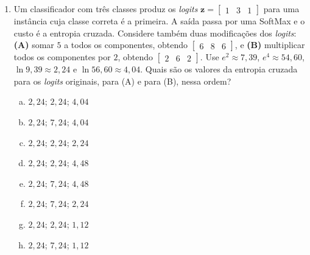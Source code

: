 \documentclass{dlproblemset}
\begin{document}
\begin{enumerate}[1)]
    Em uma iteração com $d = 4$ temos
    \[
    \mathbf{x} = (2;\ -1;\ 3;\ 0{,}5), \qquad
    \mathbf{u} = (1;\ 0;\ 1;\ 1), \qquad
    \mathbf{G} = \frac{\partial J}{\partial \mathbf{s}} = (4;\ 6;\ -2;\ 8).
    \]
    Qual é o gradiente $\partial J / \partial \mathbf{x}$ que o nodo de \textit{dropout} envia pela sua aresta de entrada?

    \begin{enumerate}[(a)]
        \item $(4;\ 6;\ -2;\ 8)$
        \item $(8;\ -6;\ -6;\ 4)$
        \item $(2;\ 0;\ 3;\ 0{,}5)$
        \item $(0;\ 6;\ 0;\ 0)$
        \item $(1;\ 0;\ 1;\ 1)$
        \item $(8;\ 0;\ -6;\ 4)$
        \item $(4;\ 0;\ -2;\ 8)$
        \item $(0;\ 0;\ 0;\ 0)$
    \end{enumerate}

    \item Um classificador com três classes produz os \textit{logits} $\mathbf{z} = \begin{bmatrix} 1 & 3 & 1 \end{bmatrix}$ para uma instância cuja classe correta é a primeira. A saída passa por uma SoftMax e o custo é a entropia cruzada. Considere também duas modificações dos \textit{logits}: \textbf{(A)} somar $5$ a todos os componentes, obtendo $\begin{bmatrix} 6 & 8 & 6 \end{bmatrix}$, e \textbf{(B)} multiplicar todos os componentes por $2$, obtendo $\begin{bmatrix} 2 & 6 & 2 \end{bmatrix}$. Use $e^{2} \approx 7{,}39$, $e^{4} \approx 54{,}60$, $\ln 9{,}39 \approx 2{,}24$ e $\ln 56{,}60 \approx 4{,}04$. Quais são os valores da entropia cruzada para os \textit{logits} originais, para (A) e para (B), nessa ordem?

    \begin{enumerate}[(a)]
        \item $2{,}24$; $2{,}24$; $4{,}04$
        \item $2{,}24$; $7{,}24$; $4{,}04$
        \item $2{,}24$; $2{,}24$; $2{,}24$
        \item $2{,}24$; $2{,}24$; $4{,}48$
        \item $2{,}24$; $7{,}24$; $4{,}48$
        \item $2{,}24$; $7{,}24$; $2{,}24$
        \item $2{,}24$; $2{,}24$; $1{,}12$
        \item $2{,}24$; $7{,}24$; $1{,}12$
    \end{enumerate}


\end{enumerate}
\end{document}
